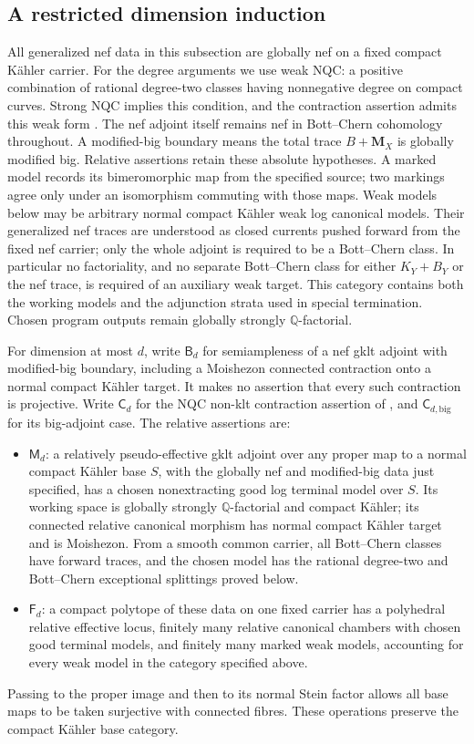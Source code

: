 \subsection{A restricted dimension induction}
\label{prog:dimension-induction}

All generalized nef data in this subsection are globally nef on a fixed
compact K\"ahler carrier. For the degree arguments we use weak NQC:
a positive combination of rational degree-two classes having
nonnegative degree on compact curves. Strong NQC implies this
condition, and the contraction assertion admits this weak form
\cite[Definition~2.43]{HX}. The nef adjoint itself remains nef in
Bott--Chern cohomology throughout. A modified-big boundary means the total trace
$B+\mathbf M_X$ is globally modified big. Relative assertions retain
these absolute hypotheses. A marked model records its bimeromorphic map
from the specified source; two markings agree only under an isomorphism
commuting with those maps. Weak models below may be arbitrary normal compact K\"ahler weak log
canonical models. Their generalized nef traces are understood as
closed currents pushed forward from the fixed nef carrier; only the
whole adjoint is required to be a Bott--Chern class. In particular no
factoriality, and no separate Bott--Chern class for either $K_Y+B_Y$
or the nef trace, is required of an auxiliary weak target. This
category contains both the working models and the adjunction strata
used in special termination. Chosen program outputs remain globally
strongly $\mathbb Q$-factorial.

For dimension at most $d$, write $\mathsf B_d$ for semiampleness of a
nef gklt adjoint with modified-big boundary, including a Moishezon
connected contraction onto a normal compact K\"ahler target. It makes
no assertion that every such contraction is projective.
Write $\mathsf C_d$ for the NQC non-klt contraction assertion of
\cite[Theorem~1.6]{HX}, and $\mathsf C_{d,\mathrm{big}}$ for its
big-adjoint case. The relative assertions are:
\begin{itemize}
\item $\mathsf M_d$: a relatively pseudo-effective gklt adjoint over
any proper map to a normal compact K\"ahler base $S$, with the globally
nef and modified-big data just specified, has a chosen nonextracting
good log terminal model over $S$. Its working space is globally
strongly $\mathbb Q$-factorial and compact K\"ahler; its connected
relative canonical morphism has normal compact K\"ahler target and
is Moishezon. From a smooth common carrier,
all Bott--Chern classes have forward traces, and the chosen model has
the rational degree-two and Bott--Chern exceptional splittings proved
below.
\item $\mathsf F_d$: a compact polytope of these data on one fixed
carrier has a polyhedral relative effective locus, finitely many
relative canonical chambers with chosen good terminal models, and
finitely many marked weak models, accounting for every weak model
in the category specified above.
\end{itemize}
Passing to the proper image and then to its normal Stein factor allows
all base maps to be taken surjective with connected fibres. These
operations preserve the compact K\"ahler base category.

